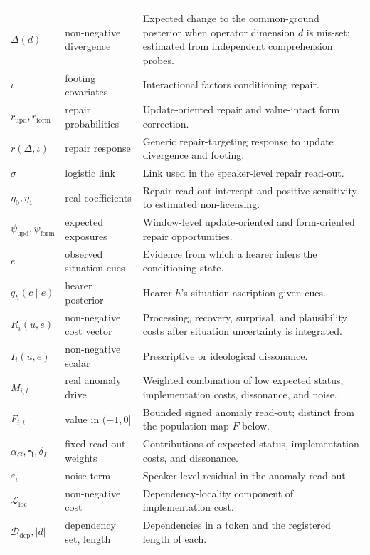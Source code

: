 \begin{longtable}{@{}>{\raggedright\arraybackslash}p{}
  >{\raggedright\arraybackslash}p{}
  >{\raggedright\arraybackslash}p{}@{}}
\multicolumn{3}{@{}l}{\textsc{Repair, read-out, and situation inference}}\\[2pt]
$\Delta(d)$ & non-negative divergence & Expected change to the common-ground posterior when operator dimension $d$ is mis-set; estimated from independent comprehension probes. \\
$\iota$ & footing covariates & Interactional factors conditioning repair. \\
$r_{\mathrm{upd}},r_{\mathrm{form}}$ & repair probabilities & Update-oriented repair and value-intact form correction. \\
$r(\Delta,\iota)$ & repair response & Generic repair-targeting response to update divergence and footing. \\
$\sigma$ & logistic link & Link used in the speaker-level repair read-out. \\
$\eta_0,\eta_1$ & real coefficients & Repair-read-out intercept and positive sensitivity to estimated non-licensing. \\
$\psi_{\mathrm{upd}},\psi_{\mathrm{form}}$ & expected exposures & Window-level update-oriented and form-oriented repair opportunities. \\
$e$ & observed situation cues & Evidence from which a hearer infers the conditioning state. \\
$q_h(c\mid e)$ & hearer posterior & Hearer $h$'s situation ascription given cues. \\
$R_i(u,e)$ & non-negative cost vector & Processing, recovery, surprisal, and plausibility costs after situation uncertainty is integrated. \\
$I_i(u,e)$ & non-negative scalar & Prescriptive or ideological dissonance. \\
$M_{i,t}$ & real anomaly drive & Weighted combination of low expected status, implementation costs, dissonance, and noise. \\
$F_{i,t}$ & value in $(-1,0]$ & Bounded signed anomaly read-out; distinct from the population map $F$ below. \\
$\alpha_G,\boldsymbol\gamma,\delta_I$ & fixed read-out weights & Contributions of expected status, implementation costs, and dissonance. \\
$\varepsilon_i$ & noise term & Speaker-level residual in the anomaly read-out. \\
$\mathcal L_{\mathrm{loc}}$ & non-negative cost & Dependency-locality component of implementation cost. \\
$\mathcal D_{\mathrm{dep}},|d|$ & dependency set, length & Dependencies in a token and the registered length of each. \\

\end{longtable}
